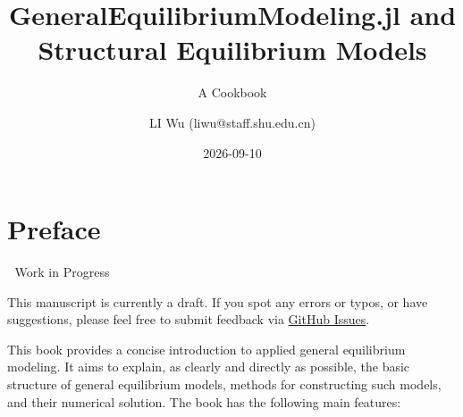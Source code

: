 \documentclass[
  letterpaper,
  DIV=11,
  numbers=noendperiod]{scrreprt}
\title{GeneralEquilibriumModeling.jl and Structural Equilibrium Models}
\subtitle{A Cookbook}
\author{LI Wu (liwu@staff.shu.edu.cn)}
\date{2026-09-10}
\renewcommand*\contentsname{Table of contents}
\newcommand\contentsname{Table of contents}
\begin{document}
\maketitle

\renewcommand*\contentsname{Table of contents}
{
\hypersetup{linkcolor=}
\setcounter{tocdepth}{2}
\tableofcontents
}


\chapter*{Preface}\label{preface}


\begin{tcolorbox}[enhanced jigsaw, opacityback=0, colbacktitle=quarto-callout-warning-color!10!white, arc=.35mm, coltitle=black, leftrule=.75mm, left=2mm, toptitle=1mm, bottomrule=.15mm, colback=white, breakable, rightrule=.15mm, title=\textcolor{quarto-callout-warning-color}{\faExclamationTriangle}\hspace{0.5em}{Warning}, toprule=.15mm, colframe=quarto-callout-warning-color-frame, bottomtitle=1mm, titlerule=0mm, opacitybacktitle=0.6]

🚧 Work in Progress

This manuscript is currently a draft. If you spot any errors or typos,
or have suggestions, please feel free to submit feedback via
\href{https://github.com/LiwuR/gembook/issues}{GitHub Issues}.

\end{tcolorbox}

This book provides a concise introduction to applied general equilibrium
modeling. It aims to explain, as clearly and directly as possible, the
basic structure of general equilibrium models, methods for constructing
such models, and their numerical solution. The book has the following
main features:
\end{document}

